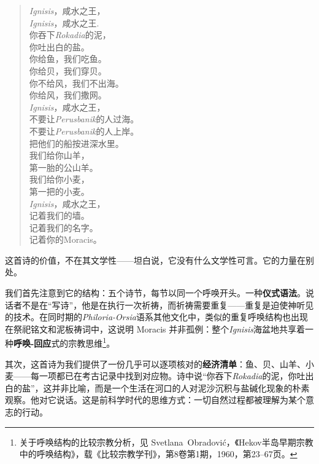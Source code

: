 {\small\kaishu
\begin{verse}
\textit{Ignisis}，咸水之王， \\
\textit{Ignisis}，咸水之王. \\
你吞下\textit{Rokadia}的泥， \\
你吐出白的盐。 \\[4pt]

你给鱼，我们吃鱼。 \\
你给贝，我们穿贝。 \\
你不给风，我们不出海。 \\
你给风，我们撒网。 \\[4pt]

\textit{Ignisis}，咸水之王， \\
不要让\textit{Perusbanik}的人过海。 \\
不要让\textit{Perusbanik}的人上岸。 \\
把他们的船按进深水里。 \\[4pt]

我们给你山羊， \\
第一胎的公山羊。 \\
我们给你小麦， \\
第一把的小麦。 \\[4pt]

\textit{Ignisis}，咸水之王， \\
记着我们的墙。 \\
记着我们的名字。 \\
记着你的Moracis。
\end{verse}}

这首诗的价值，不在其文学性——坦白说，它没有什么文学性可言。它的力量在别处。

我们首先注意到它的结构：五个诗节，每节以同一个呼唤开头。一种\textbf{仪式语法}。说话者不是在``写诗''，他是在执行一次祈祷，而祈祷需要重复——重复是迫使神听见的技术。在同时期的\textit{Philoria-Orsia}语系其他文化中，类似的重复呼唤结构也出现在祭祀铭文和泥板祷词中，这说明 Moracis 并非孤例：整个\textit{Ignisis}海盆地共享着一种\textbf{呼唤-回应}式的宗教思维\footnote{关于呼唤结构的比较宗教分析，见 Svetlana~Obradović，《Hekov半岛早期宗教中的呼唤结构》，载《比较宗教学刊》，第8卷第1期，1960，第23--67页。}。

其次，这首诗为我们提供了一份几乎可以逐项核对的\textbf{经济清单}：鱼、贝、山羊、小麦——每一项都已在考古记录中找到对应物。诗中说``你吞下\textit{Rokadia}的泥，你吐出白的盐''，这并非比喻，而是一个生活在河口的人对泥沙沉积与盐碱化现象的朴素观察。他对它说话。这是前科学时代的思维方式：一切自然过程都被理解为某个意志的行动。

